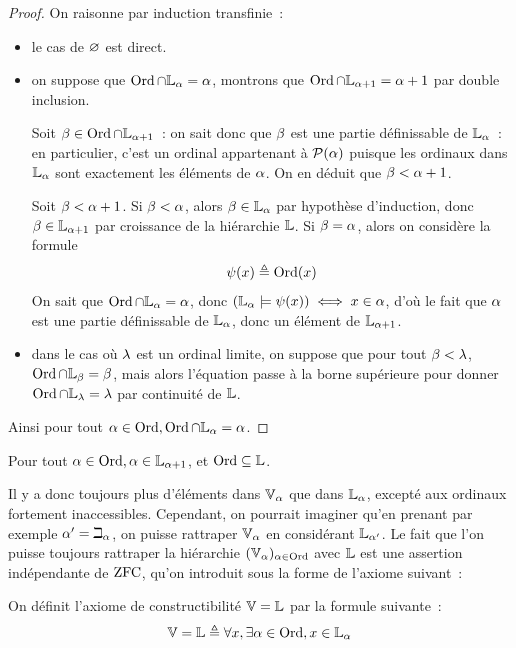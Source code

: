\begin{proof}
  On raisonne par induction transfinie~:
  \begin{itemize}
  \item le cas de $\varnothing$ est direct.
  \item on suppose que $\operatorname{Ord} \cap \mathbb L_\alpha = \alpha$, montrons que
    $\operatorname{Ord}\cap \mathbb L_{\alpha + 1} = \alpha + 1$ par double inclusion.

    Soit $\beta \in\operatorname{Ord}\cap \mathbb L_{\alpha + 1}$~: on sait donc que $\beta$ est une
    partie définissable de $\mathbb L_{\alpha}$~: en particulier, c'est un ordinal appartenant
    à $\mathcal{P}(\alpha)$ puisque les ordinaux dans $\mathbb L_{\alpha}$ sont exactement les
    éléments de $\alpha$. On en déduit que $\beta < \alpha + 1$.

    Soit $\beta < \alpha + 1$. Si $\beta < \alpha$, alors $\beta \in \mathbb L_{\alpha}$
    par hypothèse d'induction, donc $\beta \in \mathbb L_{\alpha + 1}$ par croissance
    de la hiérarchie $\mathbb L$. Si $\beta = \alpha$, alors on considère la formule
    \[\psi(x)\triangleq \operatorname{Ord}(x)\]
    On sait que $\operatorname{Ord}\cap \mathbb L_{\alpha} = \alpha$, donc
    $(\mathbb L_{\alpha} \models \psi(x)) \iff x \in \alpha$, d'où le fait que $\alpha$ est
    une partie définissable de $\mathbb L_{\alpha}$, donc un élément de $\mathbb L_{\alpha + 1}$.
  \item dans le cas où $\lambda$ est un ordinal limite, on suppose que pour tout
    $\beta < \lambda$, $\operatorname{Ord} \cap \mathbb L_\beta = \beta$, mais alors l'équation
    passe à la borne supérieure pour donner $\operatorname{Ord}\cap \mathbb L_\lambda = \lambda$ par
    continuité de $\mathbb L$.
  \end{itemize}
  Ainsi pour tout $\alpha \in \operatorname{Ord}, \operatorname{Ord} \cap \mathbb L_{\alpha} = \alpha$.
\end{proof}

\begin{corollary}
  Pour tout $\alpha \in \operatorname{Ord}, \alpha \in \mathbb L_{\alpha + 1}$, et
  $\operatorname{Ord} \subseteq \mathbb L$.
\end{corollary}

Il y a donc toujours plus d'éléments dans $\mathbb V_{\alpha}$ que dans $\mathbb L_{\alpha}$, excepté aux
ordinaux fortement inaccessibles. Cependant, on pourrait imaginer qu'en prenant
par exemple $\alpha' = \beth_\alpha$, on puisse rattraper $\mathbb V_{\alpha}$ en considérant
$\mathbb L_{\alpha'}$. Le fait que l'on puisse toujours rattraper la hiérarchie
$(\mathbb V_{\alpha})_{\alpha\in\operatorname{Ord}}$ avec $\mathbb L$ est une assertion indépendante de $\operatorname{ZFC}$, qu'on
introduit sous la forme de l'axiome suivant~:

\begin{axiom}[Constructibilité]\label{ax.VeqL}
  On définit l'axiome de constructibilité $\mathbb V = \mathbb L$ par la formule suivante~:
  \[\mathbb V = \mathbb L \triangleq \forall x, \exists \alpha \in \operatorname{Ord}, x \in \mathbb L_{\alpha}\]
\end{axiom}

